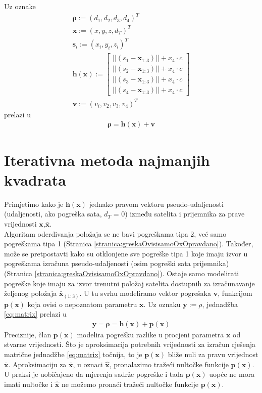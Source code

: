 \documentclass[a4paper,twoside,12pt]{memoir} %
\begin{document}
Uz oznake 
\begin{align}
\mathbf{\rho} := (d_1, d_2, d_3, d_4)^T \\ 
\mathbf{x} := (x,y,z,d_T)^T \\ 
\mathbf{s}_i := (x_i,y_i,z_i)^T \\ 
\mathbf{h} (\mathbf{x}) := 
\begin{bmatrix}
||(s_1-\mathbf{x}_{1:3})|| + x_4\cdot c\\
||(s_2-\mathbf{x}_{1:3})|| + x_4\cdot c\\
||(s_3-\mathbf{x}_{1:3})|| + x_4\cdot c\\
||(s_4-\mathbf{x}_{1:3})|| + x_4\cdot c
\end{bmatrix} \\
\mathbf{v} := (v_i,v_2,v_3,v_4)^T \label{eq:v}
\end{align}%
prelazi u
\begin{align}\label{eq:matrix}
\mathbf{\rho} = \mathbf{h}(\mathbf{x})+\mathbf{v}
\end{align}%
\section{Iterativna metoda najmanjih kvadrata}

Primjetimo kako je $\mathbf{h}(\mathbf{x})$ jednako pravom vektoru pseudo-udaljenosti (udaljenosti, ako pogreška sata, $d_T$ = 0) između
satelita i prijemnika za prave vrijednosti $\mathbf{x}$,$\bar{\mathbf{x}}$.\\
Algoritam oderđivanja položaja se ne bavi pogreškama tipa 2,
već samo pogreškama tipa 1 (Stranica \ref{stranica:greskaOvisisamoOxOpravdano}).
Također, može se pretpostavti kako su otklonjene sve pogreške tipa 1 koje imaju izvor 
u pogreškama izračuna pseudo-udaljenosti (osim pogreški sata prijemnika) (Stranica \ref{stranica:greskaOvisisamoOxOpravdano}).
Ostaje samo modelirati pogreške koje imaju za izvor trenutni položaj satelita dostupnih za
izračunavanje željenog položaja $\bar{\mathbf{x}}_{(1:3)}$.
U tu svrhu modeliramo vektor pogrešaka $\mathbf{v}$, funkcijom $\mathbf{p}(\mathbf{x})$ koja ovisi o nepoznatom parametru $\mathbf{x}$.
Uz oznaku $\mathbf{y} := \rho$, 
 jednadžba  \ref{eq:matrix} prelazi u
\begin{align}\label{eq:matrix2}
\mathbf{y} = \mathbf{\rho} = \mathbf{h}(\mathbf{x})+ \mathbf{p}(\mathbf{x})
\end{align}%
Preciznije,
član $\mathbf{p}(\mathbf{x})$ modelira pogrešku razlike u procjeni parametra $\mathbf{x}$ od stvarne vrijednosti.
Što je aproksimacija potrebnih vrijednosti za izračun rješenja matrične jednadžbe
\ref{eq:matrix} točnija, to je $\mathbf{p}(\mathbf{x})$ 
bliže nuli za pravu vrijednost $\bar{\mathbf{x}}$.
Aproksimaciju za $\bar{\mathbf{x}}$, u oznaci $\hat{\mathbf{x}}$, pronalazimo tražeći nultočke funkcije $\mathbf{p}(\mathbf{x})$.
U praksi je uobičajeno da mjerenja sadrže pogreške i tada $\mathbf{p}(\mathbf{x})$ uopće ne mora imati 
nultočke i $\hat{\mathbf{x}}$ ne možemo pronaći tražeći nultočke funkcije $\mathbf{p}(\mathbf{x})$.
\end{document}
